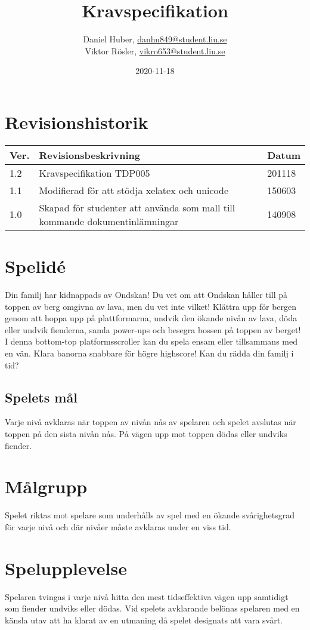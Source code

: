 \documentclass{TDP005mall}
\author{Daniel Huber, \url{danhu849@student.liu.se}\\
  Viktor Rösler, \url{vikro653@student.liu.se}}
\title{Kravspecifikation}
\date{2020-11-18}
\begin{document}
\projectpage
\tableofcontents
\section{Revisionshistorik}
\begin{table}[!h]
\begin{tabularx}{\linewidth}{|l|X|l|}
\hline
Ver. & Revisionsbeskrivning & Datum \\\hline
1.2 & Kravspecifikation TDP005 & 201118 \\\hline
1.1 & Modifierad för att stödja xelatex och unicode & 150603 \\\hline
1.0 & Skapad för studenter att använda som mall till
kommande dokumentinlämningar & 140908 \\\hline
\end{tabularx}
\end{table}


\section{Spelid\'{e} }%
Din familj har kidnappads av Ondskan! Du vet om att Ondskan håller till på toppen av berg omgivna av lava, men du vet inte vilket! Klättra upp för bergen genom att hoppa upp på plattformarna, undvik den ökande nivån av lava, döda eller undvik fienderna, samla power-ups och besegra bossen på toppen av berget! I denna bottom-top platformsscroller kan du spela ensam eller tillsammans med en vän. Klara banorna snabbare för högre highscore! Kan du rädda din familj i tid?

\subsection{Spelets mål}
Varje nivå avklaras när toppen av nivån nås av spelaren och spelet avslutas när toppen på den sista nivån nås. På vägen upp mot toppen dödas eller undviks fiender. 

\section{Målgrupp}%
Spelet riktas mot spelare som underhålls av spel med en ökande svårighetsgrad för varje nivå och där nivåer måste avklaras under en viss tid. 

\section{Spelupplevelse}%
Spelaren tvingas i varje nivå hitta den mest tidseffektiva vägen upp samtidigt som fiender undviks eller dödas. Vid spelets avklarande belönas spelaren med en känsla utav att ha klarat av en utmaning då spelet designats att vara svårt.  
\end{document}
